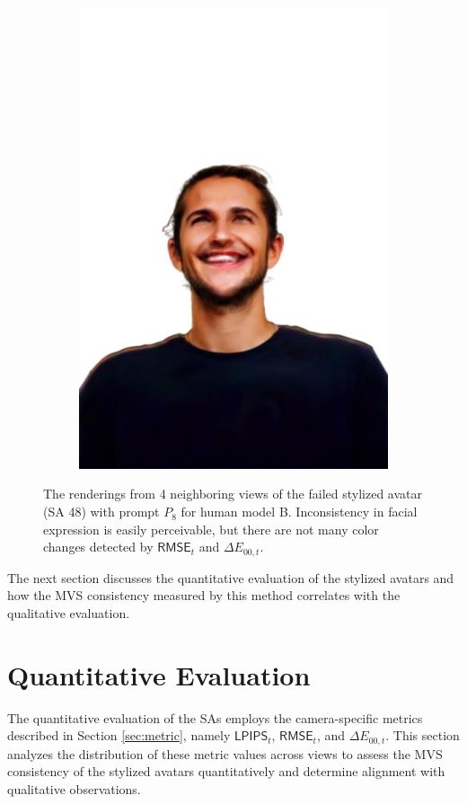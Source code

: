 \begin{figure}[ht]
\begin{subfigure}{0.2\linewidth}
		\includegraphics[width=\textwidth]{Figures/failed/smile/6_render-removebg-preview.png}
	\end{subfigure}
	\caption{The renderings from 4 neighboring views of the failed stylized avatar (SA 48) with prompt $P_8$ for human model B. Inconsistency in facial expression is easily perceivable, but there are not many color changes detected by $\mathsf{RMSE}_{t}$ and $\Delta E_{00,t}$.}
	\label{fig:failed_smile}
\end{figure}

The next section discusses the quantitative evaluation of the stylized avatars and how the MVS consistency measured by this method correlates with the qualitative evaluation.

\section{Quantitative Evaluation}
The quantitative evaluation of the SAs employs the camera-specific metrics described in Section \ref{sec:metric}, namely $\mathsf{LPIPS}_{t}$, $\mathsf{RMSE}_{t}$, and $\Delta E_{00,t}$. This section analyzes the distribution of these metric values across views to assess the MVS consistency of the stylized avatars quantitatively and determine alignment with qualitative observations.

